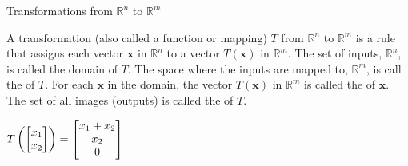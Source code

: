 \documentclass[xcolor=dvipsnames,aspectratio=169,t]{beamer}
\begin{document}
\begin{frame}{Transformations from $\mathbb{R}^n$ to $\mathbb{R}^m$}

\bbox
A \alert{transformation} (also called a function or mapping) $T$ from $\mathbb{R}^n$ to $\mathbb{R}^m$ is a rule that assigns each vector $\mathbf{x}$ in $\mathbb{R}^n$ to a vector $T(\mathbf{x})$ in $\mathbb{R}^m$.
\bi
\ii The set of inputs, $\mathbb{R}^n$, is called the \alert{domain} of $T$.
\ii The space where the inputs are mapped to, $\mathbb{R}^m$, is call the  of $T$.
\ii For each $\mathbf{x}$ in the domain, the vector $T(\mathbf{x})$ in $\mathbb{R}^m$ is called the  of $\mathbf{x}$.
\ii The set of all images (outputs) is called the  of $T$.
\ei
\ebox
\medskip

\pause
\hspace*{18em} 
$\displaystyle T\left(\begin{bmatrix} x_1 \\ x_2 \end{bmatrix}\right) = 
  \begin{bmatrix}x_1+x_2 \\ x_2 \\ 0 \end{bmatrix}$

\end{frame}
\end{document}
